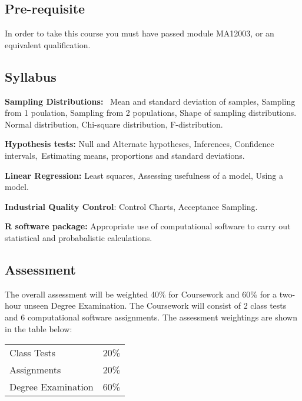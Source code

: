 \documentclass [11pt]{article}
\begin{document}
\vspace*{-0.15cm}

\subsection*{Pre-requisite} 

In order to take this course you must have passed module MA12003, or 
an equivalent qualification.




\subsection*{Syllabus}



{\bf Sampling Distributions:}
 Mean and standard deviation of samples, Sampling from 1 poulation, 
Sampling from 2 populations, Shape of sampling distributions. Normal
distribution, Chi-square distribution, F-distribution.

\vspace{0.2in}

{\bf Hypothesis tests:} Null and Alternate hypotheses, Inferences, 
Confidence intervals, Estimating means, proportions and standard deviations.


\vspace{0.2in}

{\bf Linear Regression:} Least squares, Assessing usefulness of a model, Using a model. 


\vspace{0.2in}

{\bf Industrial Quality Control}: Control Charts, Acceptance Sampling.

\vspace{0.2in}

{\bf R software package:} Appropriate use of computational software to carry out statistical and probabalistic calculations.






\subsection*{Assessment}
The overall assessment will be weighted 40\% for Coursework and 60\% 
for a two-hour unseen
Degree Examination.
The Coursework will consist of 2 class tests and 6 computational software assignments.
The assessment weightings are shown in the table below:

\begin{center}
\begin{table}[!h]
\begin{tabular}{ll}
\hline
Class Tests & 20{\%}   \\
Assignments & 20{\%}   \\
Degree Examination & 60{\%}  \\
\hline
\end{tabular}
\label{tab3}
\end{table}
\end{center}
\end{document}
